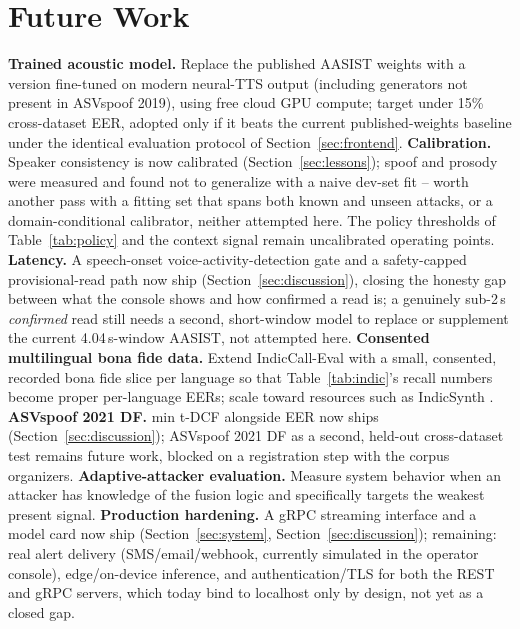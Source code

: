 \documentclass[conference]{IEEEtran}
\begin{document}
\section{Future Work}
\label{sec:future}
\textbf{Trained acoustic model.} Replace the published AASIST weights
with a version fine-tuned on modern neural-TTS output (including
generators not present in ASVspoof 2019), using free cloud GPU compute;
target under 15\% cross-dataset EER, adopted only if it beats the
current published-weights baseline under the identical evaluation
protocol of Section~\ref{sec:frontend}.
\textbf{Calibration.} Speaker consistency is now calibrated
(Section~\ref{sec:lessons}); spoof and prosody were measured and found
not to generalize with a naive dev-set fit -- worth another pass with a
fitting set that spans both known and unseen attacks, or a
domain-conditional calibrator, neither attempted here. The policy
thresholds of Table~\ref{tab:policy} and the context signal remain
uncalibrated operating points.
\textbf{Latency.} A speech-onset voice-activity-detection gate and a
safety-capped provisional-read path now ship (Section~\ref{sec:discussion}),
closing the honesty gap between what the console shows and how
confirmed a read is; a genuinely sub-2\,s \emph{confirmed} read still
needs a second, short-window model to replace or supplement the
current 4.04\,s-window AASIST, not attempted here.
\textbf{Consented multilingual bona fide data.} Extend IndicCall-Eval
with a small, consented, recorded bona fide slice per language so that
Table~\ref{tab:indic}'s recall numbers become proper per-language EERs;
scale toward resources such as IndicSynth \cite{indicsynth}.
\textbf{ASVspoof 2021 DF.} min t-DCF alongside EER now ships
(Section~\ref{sec:discussion}); ASVspoof 2021 DF as a second, held-out
cross-dataset test remains future work, blocked on a registration step
with the corpus organizers.
\textbf{Adaptive-attacker evaluation.} Measure system behavior when an
attacker has knowledge of the fusion logic and specifically targets the
weakest present signal.
\textbf{Production hardening.} A gRPC streaming interface and a model card
now ship (Section~\ref{sec:system}, Section~\ref{sec:discussion});
remaining: real alert delivery (SMS/email/webhook, currently simulated in
the operator console), edge/on-device inference, and authentication/TLS
for both the REST and gRPC servers, which today bind to localhost only by
design, not yet as a closed gap.
\end{document}
